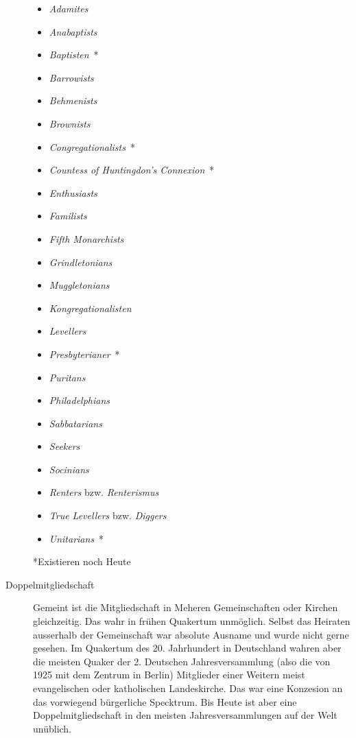 \begin{description}
\begin{itemize}
 \item \textit{Adamites}
 \item \textit{Anabaptists}
 \item \textit{Baptisten}~*
 \item \textit{Barrowists}
 \item \textit{Behmenists}
 \item \textit{Brownists}
 \item \textit{Congregationalists}~*
 \item \textit{Countess of Huntingdon's Connexion}~*
 \item \textit{Enthusiasts}
 \item \textit{Familists}
 \item \textit{Fifth Monarchists}
 \item \textit{Grindletonians}
 \item \textit{Muggletonians}
 \item \textit{Kongregationalisten}
 \item \textit{Levellers}
 \item \textit{Presbyterianer}~*
 \item \textit{Puritans}
 \item \textit{Philadelphians}
 \item \textit{Sabbatarians}
 \item \textit{Seekers}
 \item \textit{Socinians}
 \item \textit{Renters} bzw. \textit{Renterismus}
 \item \textit{True Levellers} bzw. \textit{Diggers}
 \item \textit{Unitarians}~*
\end{itemize}
*Existieren noch Heute

 \item[Doppelmitgliedschaft] Gemeint ist die Mitgliedschaft in Meheren Gemeinschaften
 oder Kirchen gleichzeitig. Das wahr in frühen Quakertum unmöglich. Selbst das
 Heiraten
 ausserhalb der Gemeinschaft war absolute Ausname und wurde nicht gerne gesehen. Im
 Quakertum des 20. Jahrhundert in Deutschland wahren aber die meisten Quaker der 2.
 Deutschen Jahresversammlung (also die von 1925 mit dem Zentrum in Berlin) Mitglieder
 einer Weitern meist evangelischen oder katholischen Landeskirche. Das war eine
 Konzesion an das vorwiegend bürgerliche Specktrum. Bis Heute ist aber eine
 Doppelmitgliedschaft in den meisten Jahresversammlungen auf der Welt unüblich.


 \end{description}

\normalsize